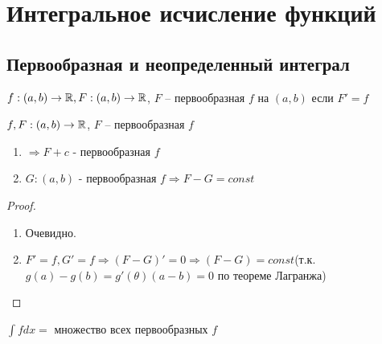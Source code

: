 \section{Интегральное исчисление функций}

\subsection{Первообразная и неопределенный интеграл}

\begin{definition}
    $f : (a, b) \rightarrow \mathbb{R}, F : (a, b) \rightarrow \mathbb{R}$, $F$ -- первообразная $f$ на $(a, b)$ если $F' = f$
\end{definition}


\begin{theorem}
    $f, F : (a, b) \rightarrow \mathbb{R}$, $F$ -- первообразная $f$ 
    \begin{enumerate}
    \item $\Rightarrow F + c$ - первообразная $f$
    \item $G : (a,b)$ - первообразная $f \Rightarrow F - G = const$ 
    \end{enumerate}
\end{theorem}

\begin{proof} \quad
    \begin{enumerate}
        \item Очевидно.
        \item $F' = f, G' = f \Rightarrow (F - G)' = 0 \Rightarrow (F - G) = const$(т.к. $g(a) - g(b) = g'(\theta)(a - b) = 0$ 
        по теореме Лагранжа)
    \end{enumerate}
\end{proof}

\begin{definition}
    $ \int f dx = $ {множество всех первообразных $f$} 
\end{definition}

